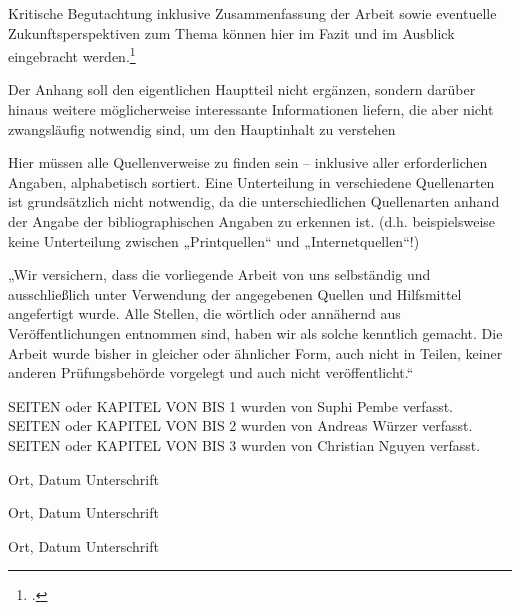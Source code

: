 \documentclass[12pt,toc=bib,toc=listof]{scrreprt}
\newcommand{\studentnameA}{Suphi Pembe}
\newcommand{\studentpartA}{SEITEN oder KAPITEL VON BIS 1}
\newcommand{\studentnameB}{Andreas Würzer}
\newcommand{\studentpartB}{SEITEN oder KAPITEL VON BIS 2}
\newcommand{\studentnameC}{Christian Nguyen}
\newcommand{\studentpartC}{SEITEN oder KAPITEL VON BIS 3}
\newcounter{savepage}
\begin{document}
Kritische Begutachtung inklusive Zusammenfassung der Arbeit sowie eventuelle Zukunftsperspektiven zum Thema können hier im Fazit und im Ausblick eingebracht werden.\footcite [Vgl.] [] {HAN2016S30}


\appendix
\newpage

\setcounter{page}{\thesavepage}

\label{sec:anhang}

Der Anhang soll den eigentlichen Hauptteil nicht ergänzen, sondern darüber hinaus weitere möglicherweise interessante Informationen liefern, die aber nicht zwangsläufig notwendig sind, um den Hauptinhalt zu verstehen

\newpage

\printbibliography[heading=head]

\vspace{2cm}

Hier müssen alle Quellenverweise zu finden sein – inklusive aller erforderlichen Angaben, alphabetisch sortiert. Eine Unterteilung in verschiedene Quellenarten ist grundsätzlich nicht notwendig, da die unterschiedlichen Quellenarten anhand der Angabe der bibliographischen Angaben zu erkennen ist. (d.h. beispielsweise keine Unterteilung zwischen „Printquellen“ und „Internetquellen“!)

\newpage

\label{sec:erklaerung}

„Wir versichern, dass die vorliegende Arbeit von uns selbständig und ausschließlich unter Verwendung der angegebenen Quellen und Hilfsmittel angefertigt wurde. Alle Stellen, die wörtlich oder annähernd aus Veröffentlichungen entnommen sind, haben wir als solche kenntlich gemacht. Die Arbeit wurde bisher in gleicher oder ähnlicher Form, auch nicht in Teilen, keiner anderen Prüfungsbehörde vorgelegt und auch nicht veröffentlicht.“

\vspace{1cm}
\noindent
{\studentpartA} wurden von {\studentnameA} verfasst.
\\
{\studentpartB} wurden von {\studentnameB} verfasst.
\\
{\studentpartC} wurden von {\studentnameC} verfasst.

\vspace{3cm}
Ort, Datum \hfill Unterschrift

\vspace{2cm}
Ort, Datum \hfill Unterschrift

\vspace{2cm}
Ort, Datum \hfill Unterschrift
\end{document}
